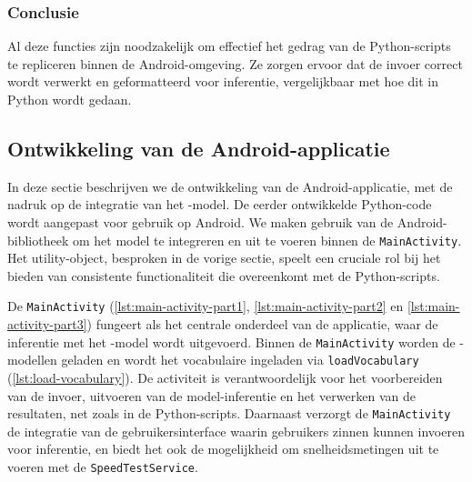 \subsubsection{Conclusie}
Al deze functies zijn noodzakelijk om effectief het gedrag van de Python-scripts te repliceren binnen de Android-omgeving. Ze zorgen ervoor dat de invoer correct wordt verwerkt en geformatteerd voor inferentie, vergelijkbaar met hoe dit in Python wordt gedaan.

\subsection{Ontwikkeling van de Android-applicatie}

In deze sectie beschrijven we de ontwikkeling van de Android-applicatie, met de nadruk op de integratie van het -model. De eerder ontwikkelde Python-code wordt aangepast voor gebruik op Android. We maken gebruik van de  Android-bibliotheek om het model te integreren en uit te voeren binnen de \texttt{MainActivity}. Het utility-object, besproken in de vorige sectie, speelt een cruciale rol bij het bieden van consistente functionaliteit die overeenkomt met de Python-scripts.

De \texttt{MainActivity} (\ref{lst:main-activity-part1}, \ref{lst:main-activity-part2} en \ref{lst:main-activity-part3}) fungeert als het centrale onderdeel van de applicatie, waar de inferentie met het -model wordt uitgevoerd. Binnen de \texttt{MainActivity} worden de -modellen geladen en wordt het vocabulaire ingeladen via \texttt{loadVocabulary} (\ref{lst:load-vocabulary}). De activiteit is verantwoordelijk voor het voorbereiden van de invoer, uitvoeren van de model-inferentie en het verwerken van de resultaten, net zoals in de Python-scripts. Daarnaast verzorgt de \texttt{MainActivity} de integratie van de gebruikersinterface waarin gebruikers zinnen kunnen invoeren voor inferentie, en biedt het ook de mogelijkheid om snelheidsmetingen uit te voeren met de \texttt{SpeedTestService}.


